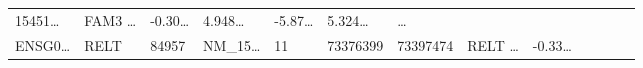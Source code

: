 \documentclass[
]{article}
\begin{document}
\begin{longtable}[]{@{}lllllllllllll@{}}
\begin{minipage}[t]{0.05\columnwidth}
15451\ldots{}\strut
\end{minipage} & \begin{minipage}[t]{0.05\columnwidth}\raggedright
FAM3 \ldots{}\strut
\end{minipage} & \begin{minipage}[t]{0.05\columnwidth}\raggedright
-0.30\ldots{}\strut
\end{minipage} & \begin{minipage}[t]{0.05\columnwidth}\raggedright
4.948\ldots{}\strut
\end{minipage} & \begin{minipage}[t]{0.05\columnwidth}\raggedright
-5.87\ldots{}\strut
\end{minipage} & \begin{minipage}[t]{0.05\columnwidth}\raggedright
5.324\ldots{}\strut
\end{minipage} & \begin{minipage}[t]{0.02\columnwidth}\raggedright
\ldots{}\strut
\end{minipage}\tabularnewline
\begin{minipage}[t]{0.05\columnwidth}\raggedright
ENSG0\ldots{}\strut
\end{minipage} & \begin{minipage}[t]{0.05\columnwidth}\raggedright
RELT\strut
\end{minipage} & \begin{minipage}[t]{0.05\columnwidth}\raggedright
84957\strut
\end{minipage} & \begin{minipage}[t]{0.05\columnwidth}\raggedright
NM\_15\ldots{}\strut
\end{minipage} & \begin{minipage}[t]{0.05\columnwidth}\raggedright
11\strut
\end{minipage} & \begin{minipage}[t]{0.05\columnwidth}\raggedright
73376399\strut
\end{minipage} & \begin{minipage}[t]{0.05\columnwidth}\raggedright
73397474\strut
\end{minipage} & \begin{minipage}[t]{0.05\columnwidth}\raggedright
RELT \ldots{}\strut
\end{minipage} & \begin{minipage}[t]{0.05\columnwidth}\raggedright
-0.33\ldots{}\strut
\end{minipage} & \begin{minipage}[t]{0.05\columnwidth}\raggedright

\end{minipage}
\end{longtable}
\end{document}
